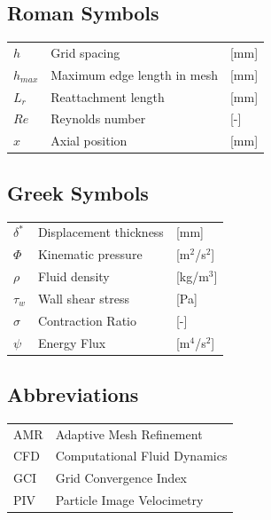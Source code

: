 \documentclass[12pt, a4paper]{article}
\begin{document}
\subsection*{Roman Symbols}
\begin{tabular}{lll}
	$h$             & Grid spacing                               & [mm] \\
	$h_{max}$       & Maximum edge length in mesh                         & [mm] \\
	$L_r$           & Reattachment length                                 & [mm] \\
	$Re$            & Reynolds number                                     & [-] \\
	$x$             & Axial position              & [mm] \\
\end{tabular}

\subsection*{Greek Symbols}
\begin{tabular}{lll}
	$\delta^*$      & Displacement thickness                               & [mm] \\
    $\Phi$        & Kinematic pressure & [m$^2$/s$^2$] \\
	$\rho$          & Fluid density                                                         & [kg/m$^3$] \\
	$\tau_w$        & Wall shear stress             & [Pa] \\
	$\sigma$        & Contraction Ratio             & [-]  \\
	$\psi$        & Energy Flux     & [m$^4$/s$^2$] \\
	
\end{tabular}

\subsection*{Abbreviations}
\begin{tabular}{ll}
	AMR             & Adaptive Mesh Refinement                             \\
	CFD             & Computational Fluid Dynamics                         \\
	GCI             & Grid Convergence Index                               \\
	PIV             & Particle Image Velocimetry                           \\
\end{tabular}
\end{document}

